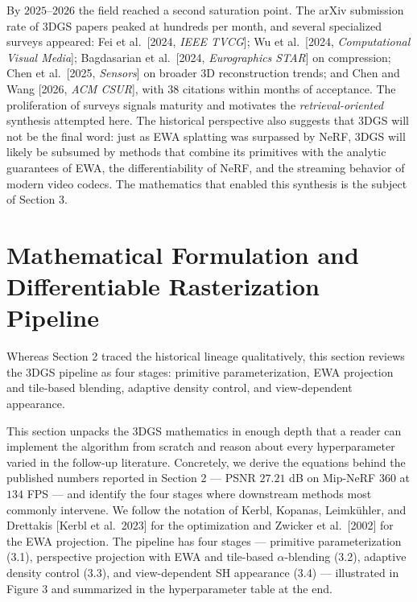 By \(2025\)--\(2026\) the field reached a second saturation point. The arXiv submission rate of 3DGS papers peaked at hundreds per month, and several specialized surveys appeared: Fei et al.~{[}2024, \emph{IEEE TVCG}{]}; Wu et al.~{[}2024, \emph{Computational Visual Media}{]}; Bagdasarian et al.~{[}2024, \emph{Eurographics STAR}{]} on compression; Chen et al.~{[}2025, \emph{Sensors}{]} on broader 3D reconstruction trends; and Chen and Wang {[}2026, \emph{ACM CSUR}{]}, with \(38\) citations within months of acceptance. The proliferation of surveys signals maturity and motivates the \emph{retrieval-oriented} synthesis attempted here. The historical perspective also suggests that 3DGS will not be the final word: just as EWA splatting was surpassed by NeRF, 3DGS will likely be subsumed by methods that combine its primitives with the analytic guarantees of EWA, the differentiability of NeRF, and the streaming behavior of modern video codecs. The mathematics that enabled this synthesis is the subject of Section 3.

\section{Mathematical Formulation and Differentiable Rasterization Pipeline}\label{mathematical-formulation-and-differentiable-rasterization-pipeline}

Whereas Section 2 traced the historical lineage qualitatively, this section reviews the 3DGS pipeline as four stages: primitive parameterization, EWA projection and tile-based blending, adaptive density control, and view-dependent appearance.

This section unpacks the 3DGS mathematics in enough depth that a reader can implement the algorithm from scratch and reason about every hyperparameter varied in the follow-up literature. Concretely, we derive the equations behind the published numbers reported in Section 2 --- PSNR \(27.21\) dB on Mip-NeRF 360 at \(134\) FPS --- and identify the four stages where downstream methods most commonly intervene. We follow the notation of Kerbl, Kopanas, Leimkühler, and Drettakis {[}Kerbl et al.~2023{]} for the optimization and Zwicker et al.~{[}2002{]} for the EWA projection. The pipeline has four stages --- primitive parameterization (3.1), perspective projection with EWA and tile-based \(\alpha\)-blending (3.2), adaptive density control (3.3), and view-dependent SH appearance (3.4) --- illustrated in Figure 3 and summarized in the hyperparameter table at the end.

